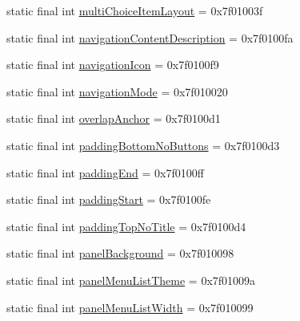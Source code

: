 \begin{CompactItemize}
\item 
static final int \hyperlink{classandroid_1_1support_1_1graphics_1_1drawable_1_1animated_1_1_r_1_1attr_912897bfce4f8d3e72fabcd24a8f7198}{multiChoiceItemLayout} = 0x7f01003f
\item 
static final int \hyperlink{classandroid_1_1support_1_1graphics_1_1drawable_1_1animated_1_1_r_1_1attr_48b8e32467ad0c9b5439a569b099c21d}{navigationContentDescription} = 0x7f0100fa
\item 
static final int \hyperlink{classandroid_1_1support_1_1graphics_1_1drawable_1_1animated_1_1_r_1_1attr_764d023fdd48a25236644f0e81b51c77}{navigationIcon} = 0x7f0100f9
\item 
static final int \hyperlink{classandroid_1_1support_1_1graphics_1_1drawable_1_1animated_1_1_r_1_1attr_c89a67d561cc3e86127bba13945ab266}{navigationMode} = 0x7f010020
\item 
static final int \hyperlink{classandroid_1_1support_1_1graphics_1_1drawable_1_1animated_1_1_r_1_1attr_31d9ec365e505a37928a20e7b9117b81}{overlapAnchor} = 0x7f0100d1
\item 
static final int \hyperlink{classandroid_1_1support_1_1graphics_1_1drawable_1_1animated_1_1_r_1_1attr_d042d319f3a81977dd3126ed6f17b016}{paddingBottomNoButtons} = 0x7f0100d3
\item 
static final int \hyperlink{classandroid_1_1support_1_1graphics_1_1drawable_1_1animated_1_1_r_1_1attr_d2504a0ff52706fb9572d228e89ffe8d}{paddingEnd} = 0x7f0100ff
\item 
static final int \hyperlink{classandroid_1_1support_1_1graphics_1_1drawable_1_1animated_1_1_r_1_1attr_a95707a9e48b1ed06bd41ee52003bee0}{paddingStart} = 0x7f0100fe
\item 
static final int \hyperlink{classandroid_1_1support_1_1graphics_1_1drawable_1_1animated_1_1_r_1_1attr_d9316675df74084daf59d776a2e07452}{paddingTopNoTitle} = 0x7f0100d4
\item 
static final int \hyperlink{classandroid_1_1support_1_1graphics_1_1drawable_1_1animated_1_1_r_1_1attr_5528036b7de74e7411e0b6bba9bec510}{panelBackground} = 0x7f010098
\item 
static final int \hyperlink{classandroid_1_1support_1_1graphics_1_1drawable_1_1animated_1_1_r_1_1attr_624b27899585734a5c78a749908627ca}{panelMenuListTheme} = 0x7f01009a
\item 
static final int \hyperlink{classandroid_1_1support_1_1graphics_1_1drawable_1_1animated_1_1_r_1_1attr_6cc49c0df5a86ebc36180a2e0bac430a}{panelMenuListWidth} = 0x7f010099
\item 

\end{CompactItemize}
